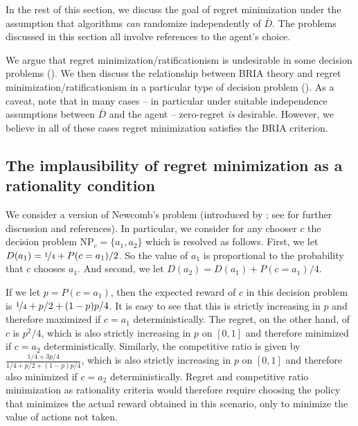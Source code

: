 \documentclass[submission,copyright,creativecommons]{eptcs}
\begin{document}
In the rest of this section, we discuss the goal of regret minimization under the assumption that algorithms \textit{can} randomize independently of $\bar D$. The problems discussed in this section all involve references to the agent's choice.

\begin{extendedonlyblock}

We argue that regret minimization/ratificationism is undesirable in some decision problems (). We then discuss the relationship between BRIA theory and regret minimization/ratificationism in a particular type of decision problem (). As a caveat, note that in many cases -- in particular under suitable independence assumptions between $\bar D$ and the agent -- zero-regret \textit{is} desirable. However, we believe in all of these cases regret minimization satisfies the BRIA criterion.

\end{extendedonlyblock}

\begin{extendedonlyblock}

\subsection{The implausibility of regret minimization as a rationality condition}
\label{sec:regret-minimization-is-implausible}

\end{extendedonlyblock}

\label{Newcombs-problem}
We consider a version of Newcomb's problem (introduced by \cite{Nozick1969}; see  for further discussion and references). In particular, we consider for any chooser $c$ the decision problem $\mathrm{NP}_c=\{a_1,a_2\}$ which is resolved as follows. First, we let $D(a_1)=\nicefrac{1}{4}+P(c=a_1)/2$.
So the value of $a_1$ is proportional to the probability that $c$ chooses $a_1$. And second, we let $D(a_2)=D(a_1)+P(c=a_1)/4$.

If we let $p=P(c=a_1)$, then the expected reward of $c$ in this decision problem is $\nicefrac{1}{4}+p/2 + (1-p)p/4$.
It is easy to see that this is strictly increasing in $p$ and therefore maximized if $c=a_1$ deterministically. The regret, on the other hand, of $c$ is $p^2/4$, which is also strictly increasing in $p$ on $[0,1]$ and therefore minimized if $c=a_2$ deterministically. Similarly, the competitive ratio is given by $\frac{1/4+3p/4}{1/4 + p/2+(1-p)p/4}$,
which is also strictly increasing in $p$ on $[0,1]$ and therefore also minimized if $c=a_2$ deterministically.
Regret and competitive ratio minimization as rationality criteria would therefore require choosing the policy that minimizes the actual reward obtained in this scenario, only to minimize the value of actions not taken.
\end{document}

